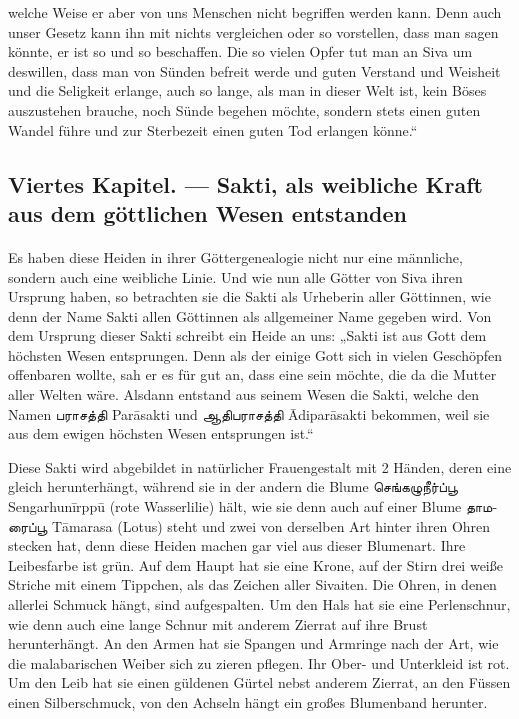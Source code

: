 \documentclass{article}
\newcommand{\TamilText}[1]{\texttamil{#1}}
\newcommand{\tam}[1]{\TamilText{#1}}
\begin{document}
welche Weise er aber von uns Menschen nicht begriffen werden kann. Denn auch unser Gesetz kann ihn mit nichts vergleichen oder so vorstellen, dass man sagen könnte, er ist so und so beschaffen. Die so vielen Opfer tut man an Siva um deswillen, dass man von Sünden befreit werde und guten Verstand und Weisheit und die Seligkeit erlange, auch so lange, als man in dieser Welt ist, kein Böses auszustehen brauche, noch Sünde begehen möchte, sondern stets einen guten Wandel führe und zur Sterbezeit einen guten Tod erlangen könne.“
\clearpage
\subsection{Viertes Kapitel. — Sakti, als weibliche Kraft aus dem göttlichen Wesen entstanden}
\paragraph{}
Es haben diese Heiden in ihrer Göttergenealogie nicht nur eine männliche, sondern auch eine weibliche Linie. Und wie nun alle Götter von Siva ihren Ursprung haben, so betrachten sie die Sakti als Urheberin aller Göttinnen, wie denn der Name Sakti allen Göttinnen als allgemeiner Name gegeben wird. Von dem Ursprung dieser Sakti schreibt ein Heide an uns: „Sakti ist aus Gott dem höchsten Wesen entsprungen. Denn als der einige Gott sich in vielen Geschöpfen offenbaren wollte, sah er es für gut an, dass eine sein möchte, die da die Mutter aller Welten wäre. Alsdann entstand aus seinem Wesen die Sakti, welche den Namen \tam{பராசத்தி} Par\={a}sakti und \tam{ஆதிபராசத்தி} \={A}dipar\={a}sakti bekommen, weil sie aus dem ewigen höchsten Wesen entsprungen ist.“

Diese Sakti wird abgebildet in natürlicher Frauengestalt mit 2 Händen, deren eine gleich herunterhängt, während sie in der andern die Blume \tam{செங்கழுநீர்ப்பூ} Sengarhun\={i}rpp\={u} (rote Wasserlilie) hält, wie sie denn auch auf einer Blume \tam{தாமரைப்பூ} T\={a}marasa (Lotus) steht und zwei von derselben Art hinter ihren Ohren stecken hat, denn diese Heiden machen gar viel aus dieser Blumenart. Ihre Leibesfarbe ist grün. Auf dem Haupt hat sie eine Krone, auf der Stirn drei weiße Striche mit einem Tippchen, als das Zeichen aller Sivaiten. Die Ohren, in denen allerlei Schmuck hängt, sind aufgespalten. Um den Hals hat sie eine Perlenschnur, wie denn auch eine lange Schnur mit anderem Zierrat auf ihre Brust herunterhängt. An den Armen hat sie Spangen und Armringe nach der Art, wie die malabarischen Weiber sich zu zieren pflegen. Ihr Ober- und Unterkleid ist rot. Um den Leib hat sie einen güldenen Gürtel nebst anderem Zierrat, an den Füssen einen Silberschmuck, von den Achseln hängt ein großes Blumenband herunter.
\end{document}

